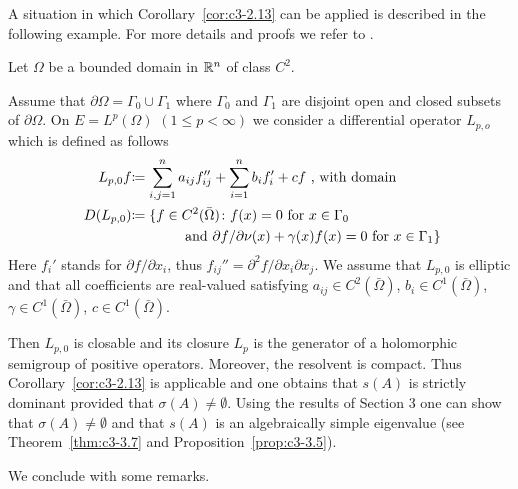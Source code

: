 A situation in which Corollary~\ref{cor:c3-2.13} can be applied is described in the following example.
For more details and proofs we refer to \citet{amann:1983}.
\begin{example}\label{ex:c3-2.14}
	Let $\Omega$ be a bounded domain in $\mathbb{R} ^{n}$ of class $C^{2}$.
	
	Assume that $\partial\Omega = \Gamma_{0}\cup\Gamma_{1}$ where $\Gamma_{0}$ and $\Gamma_{1}$ are disjoint open and
%
%
closed subsets of $\partial\Omega$.
On $E = L^{p}(\Omega)$ $(1 \leq p < \infty)$ we consider a differential operator $L_{p,o}$ which is defined as follows
\begin{equation}\label{eq:c3-2.23}
	\begin{aligned}
\text{$L_{p,0}f$} &\text{$\coloneqq \sum_{i,j=1}^{n} a_{ij} f_{ij}'' + \sum_{i=1}^{n} b_{i} f_{i}' + cf$ , with domain} \\
\text{ $D(L_{p,0})$} & \text{$\coloneqq \{f \in C^{2}(\bar{\Omega}) \colon$} 
\text{$ f(x) = 0$ for $x \in \Gamma_{0}$}\\ 
& \text{\phantom{aaaaaaa} and $\partial f/\partial\nu (x) + \gamma(x)f(x) = 0$ for $x \in \Gamma_{1}\}$}
	\end{aligned}
\end{equation}
Here $f_{i}'$ stands for $\partial f/\partial x_{i}$, thus $f_{ij}'' = \partial^{2}f/\partial x_{i}\partial x_{j}$.
We assume that $L_{p,0}$ is elliptic and that all coefficients are real-valued satisfying $a_{ij} \in C^{2}(\bar{\Omega})$, $b_{i} \in C^{1}(\bar{\Omega})$, $\gamma \in C^{1}(\bar{\Omega})$, $c \in C^{1}(\bar{\Omega})$.

Then $L_{p,0}$ is closable and its closure $L_{p}$ is the generator of a holomorphic semigroup of positive operators.
Moreover, the resolvent is compact.
Thus Corollary~\ref{cor:c3-2.13} is applicable and one obtains that $s(A)$ is strictly dominant provided that $\sigma(A) \neq \emptyset$.
Using the results of Section 3 one can show that $\sigma(A) \neq \emptyset$ and that $s(A)$ is an algebraically simple eigenvalue (see Theorem~\ref{thm:c3-3.7} and Proposition~\ref{prop:c3-3.5}).
\end{example}

We conclude with some remarks.

